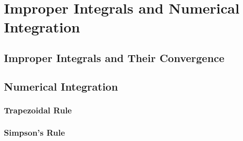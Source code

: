 \chapter{Improper Integrals and Numerical Integration}

\section{Improper Integrals and Their Convergence}

\section{Numerical Integration}
\subsection{Trapezoidal Rule}
\subsection{Simpson's Rule}
